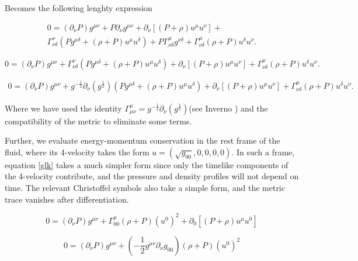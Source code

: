 Becomes the following lenghty expression

\begin{equation}
\begin{matrix}
0 = (\partial_\nu P) g^{\mu \nu} + P \partial_\nu g^{\mu \nu} +\partial_\nu \left[ (P+\rho) u^\mu u^\nu \right]+ \\ \Gamma^\nu_{\nu \delta}(P g^{\mu \delta} + (\rho+P)u^\mu u^\delta ) + P \Gamma^\mu_{\nu \delta} g^{\nu \delta} +\Gamma^\mu_{\nu \delta} (\rho+ P) u^\delta u^\nu.
\end{matrix}
\end{equation}

\begin{equation}
0 = (\partial_\nu P) g^{\mu \nu} + \Gamma^\nu_{\nu \delta}(P g^{\mu \delta} + (\rho+P)u^\mu u^\delta ) + \partial_\nu \left[ (P+\rho) u^\mu u^\nu \right]+ \Gamma^\mu_{\nu \delta} (\rho+ P) u^\delta u^\nu.
\end{equation}

\begin{equation}\label{glk}
\begin{matrix}
0 = (\partial_\nu P) g^{\mu \nu} + g^{-\frac{1}{2}}\partial_\nu(g^{\frac{1}{2}})  (P g^{\mu \delta} + (\rho+P)u^\mu u^\delta ) + \partial_\nu \left[ (P+\rho) u^\mu u^\nu \right]+ \Gamma^\mu_{\nu \delta} (\rho+ P) u^\delta u^\nu.
\end{matrix}
\end{equation}

Where we have used the identity $\Gamma^\mu_{\mu \nu}=g^{-\frac{1}{2}}\partial_\nu(g^{\frac{1}{2}})$(see Inverno \cite[chapter 7]{inverno}) and the compatibility of the metric to eliminate some terms. 

Further, we evaluate energy-momentum conservation in the rest frame of the fluid, where its 4-velocity takes the form $u=(\sqrt{g_{00}},0,0,0,0)$.  In such a frame, equation \ref{glk} takes a much simpler form since only the timelike components of the 4-velocity contribute, and the pressure and density profiles will not depend on time. The relevant Christoffel symbols also take a simple form, and the metric trace vanishes after differentiation. 

\begin{equation}
0 = (\partial_\nu P) g^{\mu \nu} + \Gamma^\mu_{00} (\rho+ P) (u^0)^2 + \partial_0 \left[ (P+\rho) u^\mu u^0 \right]
\end{equation}

\begin{equation}
0 = (\partial_\nu P) g^{\mu \nu} + \left(-\frac{1}{2}g^{\mu \nu} \partial_\nu g_{00} \right) (\rho+ P) (u^0)^2 
\end{equation}

